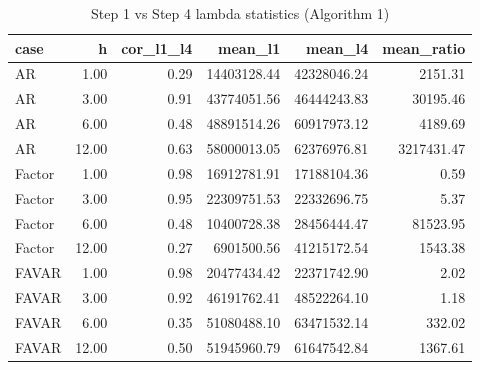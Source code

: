 \begin{table}[ht]
\centering
\begin{tabular}{lrrrrr}
  \hline
case & h & cor\_l1\_l4 & mean\_l1 & mean\_l4 & mean\_ratio \\ 
  \hline
AR & 1.00 & 0.29 & 14403128.44 & 42328046.24 & 2151.31 \\ 
  AR & 3.00 & 0.91 & 43774051.56 & 46444243.83 & 30195.46 \\ 
  AR & 6.00 & 0.48 & 48891514.26 & 60917973.12 & 4189.69 \\ 
  AR & 12.00 & 0.63 & 58000013.05 & 62376976.81 & 3217431.47 \\ 
  Factor & 1.00 & 0.98 & 16912781.91 & 17188104.36 & 0.59 \\ 
  Factor & 3.00 & 0.95 & 22309751.53 & 22332696.75 & 5.37 \\ 
  Factor & 6.00 & 0.48 & 10400728.38 & 28456444.47 & 81523.95 \\ 
  Factor & 12.00 & 0.27 & 6901500.56 & 41215172.54 & 1543.38 \\ 
  FAVAR & 1.00 & 0.98 & 20477434.42 & 22371742.90 & 2.02 \\ 
  FAVAR & 3.00 & 0.92 & 46191762.41 & 48522264.10 & 1.18 \\ 
  FAVAR & 6.00 & 0.35 & 51080488.10 & 63471532.14 & 332.02 \\ 
  FAVAR & 12.00 & 0.50 & 51945960.79 & 61647542.84 & 1367.61 \\ 
   \hline
\end{tabular}
\caption{Step 1 vs Step 4 lambda statistics (Algorithm 1)} 
\label{tab:lambdas_stats}
\end{table}
